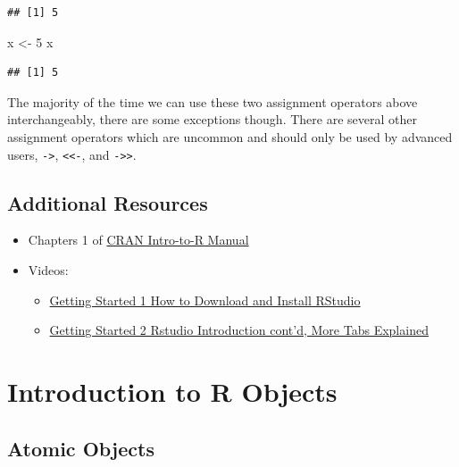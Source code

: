 \documentclass[
]{book}
\newenvironment{Shaded}{\begin{snugshade}}{\end{snugshade}}
\newcommand{\DecValTok}[1]{\textcolor[rgb]{0.00,0.00,0.81}{#1}}
\newcommand{\NormalTok}[1]{#1}
\newcommand{\StringTok}[1]{\textcolor[rgb]{0.31,0.60,0.02}{#1}}
\providecommand{\tightlist}{%
  \setlength{\itemsep}{0pt}\setlength{\parskip}{0pt}}
\begin{document}
\begin{verbatim}
## [1] 5
\end{verbatim}

\begin{Shaded}
\begin{Highlighting}[]
\NormalTok{x <-}\StringTok{ }\DecValTok{5}
\NormalTok{x}
\end{Highlighting}
\end{Shaded}

\begin{verbatim}
## [1] 5
\end{verbatim}

The majority of the time we can use these two assignment operators above interchangeably, there are some exceptions though. There are several other assignment operators which are uncommon and should only be used by advanced users, \texttt{-\textgreater{}}, \texttt{\textless{}\textless{}-}, and \texttt{-\textgreater{}\textgreater{}}.

\hypertarget{additional-resources}{%
\section{Additional Resources}\label{additional-resources}}

\begin{itemize}
\tightlist
\item
  Chapters 1 of \href{https://cran.r-project.org/doc/manuals/r-release/R-intro.pdf}{CRAN Intro-to-R Manual}
\item
  Videos:

  \begin{itemize}
  \tightlist
  \item
    \href{https://ucr.yuja.com/V/Video?v=2365045\&node=8476457\&a=437885577\&autoplay=1}{Getting Started 1 \textbar{} How to Download and Install RStudio}
  \item
    \href{https://ucr.yuja.com/V/Video?v=2368643\&node=8487538\&a=437248619\&autoplay=1}{Getting Started 2 \textbar{} Rstudio Introduction cont'd, More Tabs Explained}
  \end{itemize}
\end{itemize}

\hypertarget{introduction-to-r-objects}{%
\chapter{Introduction to R Objects}\label{introduction-to-r-objects}}

\hypertarget{atomic-objects}{%
\section{Atomic Objects}\label{atomic-objects}}
\end{document}
